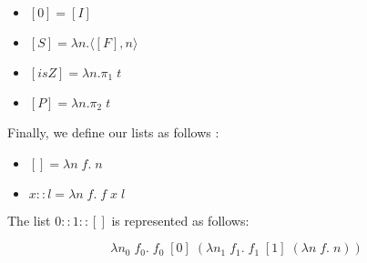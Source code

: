 \documentclass{article}
\theoremstyle{plain}
\begin{document}
  \begin{multicols}{2}
    \begin{itemize}
      \item $[0] = [I]$
      \item $[S] = \lambda n. \langle [F], n\rangle$
      \item $[\textit{isZ}] = \lambda n. \pi_1\;t$
      \item $[P] = \lambda n. \pi_2\;t$
    \end{itemize}
  \end{multicols}

  Finally, we define our lists as follows :

  \begin{itemize}
    \item $[] = \lambda n\;f.\; n$
    \item $x :: l = \lambda n\;f.\; f\; x\; l$
  \end{itemize}

  \begin{center}
    The list $0 :: 1 :: []$ is represented as follows:
  \end{center}
  $$\lambda n_0\; f_0.\; f_0\; [0]\; (\lambda n_1\;f_1.\; f_1\;[1]\;(\lambda
  n\;f.\;n))$$
\end{document}
